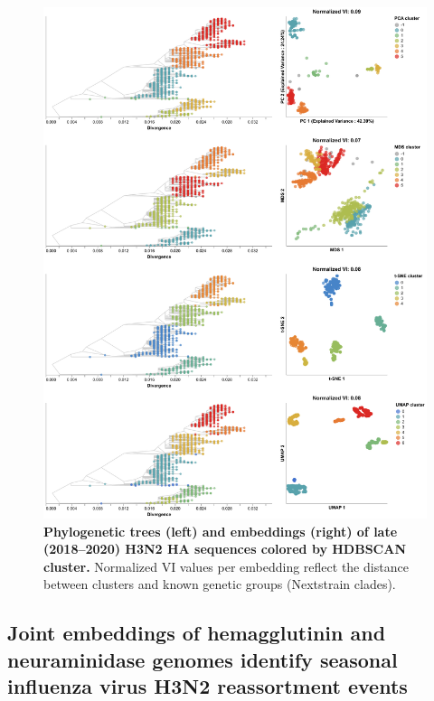 \documentclass[10pt,letterpaper]{article}
\begin{document}
\begin{figure}[!h]
\includegraphics[width=\columnwidth]{figures/flu-2018-2020-ha-embeddings-by-cluster.png}
\caption{{\bf Phylogenetic trees (left) and embeddings (right) of late (2018--2020) H3N2 HA sequences colored by HDBSCAN cluster.}
Normalized VI values per embedding reflect the distance between clusters and known genetic groups (Nextstrain clades).}
\label{fig:seasonal-influenza-h3n2-ha-2018-2020-clusters}
\end{figure}

\subsection*{Joint embeddings of hemagglutinin and neuraminidase genomes identify seasonal influenza virus H3N2 reassortment events}
\end{document}
